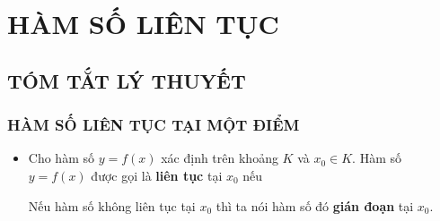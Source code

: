 \def\tenchude{HÀM SỐ LIÊN TỤC}
\section{HÀM SỐ LIÊN TỤC}
\subsection{TÓM TẮT LÝ THUYẾT}
\subsubsection{HÀM SỐ LIÊN TỤC TẠI MỘT ĐIỂM}
\begin{itemize}
	\item [\iconMT]  Cho hàm số $y=f(x)$ xác định trên khoảng $K$ và $x_0\in K$. Hàm số $y=f(x)$ được gọi là \textbf{liên tục} tại $x_0$ nếu 
	\begin{note}
		Nếu hàm số không liên tục tại $x_0$ thì ta nói hàm số đó \textbf{gián đoạn} tại $x_0$.
	\end{note}
\end{itemize}

